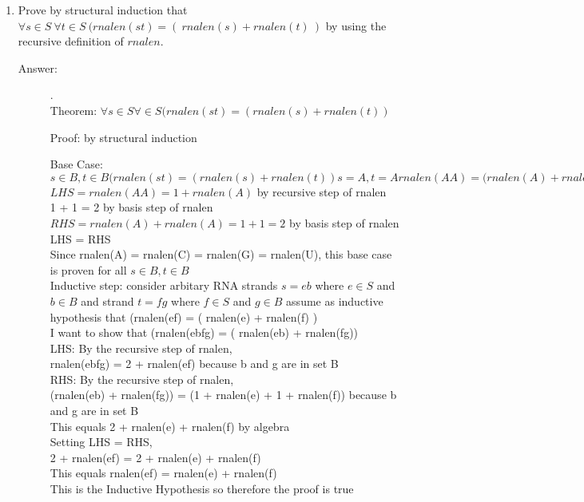 \documentclass[12pt, oneside]{article}
\begin{document}
\begin{enumerate}
\item Prove by structural induction that $\forall s \in S~\forall t \in S~(rnalen(st) = (~rnalen(s) + rnalen(t)~)$ by using the recursive definition of $rnalen$.
\begin{description}
    \item[Answer:] .\\
    Theorem: $\forall s \in S \forall \in S (rnalen(st) = ( rnalen(s) + rnalen(t) )$
    
    Proof: by structural induction

    Base Case: $s \in B, t \in B (rnalen(st) = ( rnalen(s) + rnalen(t) )  s = A, t = A   rnalen(AA) = (rnalen(A) + rnalen(A)$\\

    $LHS =  rnalen(AA) = 1 + rnalen(A)$ by recursive step of rnalen\\
    1 + 1 = 2 by basis step of rnalen\\

    $RHS = rnalen(A) + rnalen(A) = 1 + 1 = 2$ by basis step of rnalen\\
    LHS = RHS\\
    
    Since rnalen(A) = rnalen(C) =  rnalen(G) = rnalen(U), this base case is proven for all $s \in B, t \in B$\\
    
    Inductive step: consider arbitary RNA strands $s = eb$ where $e \in S$ and $b \in B$ and strand $t = fg$ where $f \in S$ and $g \in B$ assume as inductive hypothesis that (rnalen(ef) = ( rnalen(e) + rnalen(f) )\\

    I want to show that (rnalen(ebfg) = ( rnalen(eb) + rnalen(fg))\\
    LHS: By the recursive step of rnalen,\\
    rnalen(ebfg) = 2 + rnalen(ef) because b and g are in set B\\
    RHS: By the recursive step of rnalen, \\
    (rnalen(eb) + rnalen(fg)) = (1 + rnalen(e) + 1 + rnalen(f)) because b and g are in set B\\
    This equals 2 + rnalen(e) + rnalen(f) by algebra\\
    Setting LHS = RHS,\\
    2 + rnalen(ef) = 2 + rnalen(e) + rnalen(f) \\
    This equals rnalen(ef) =  rnalen(e) + rnalen(f) \\
    This is the Inductive Hypothesis so therefore the proof is true
\end{description}


\end{enumerate}
\end{document}
